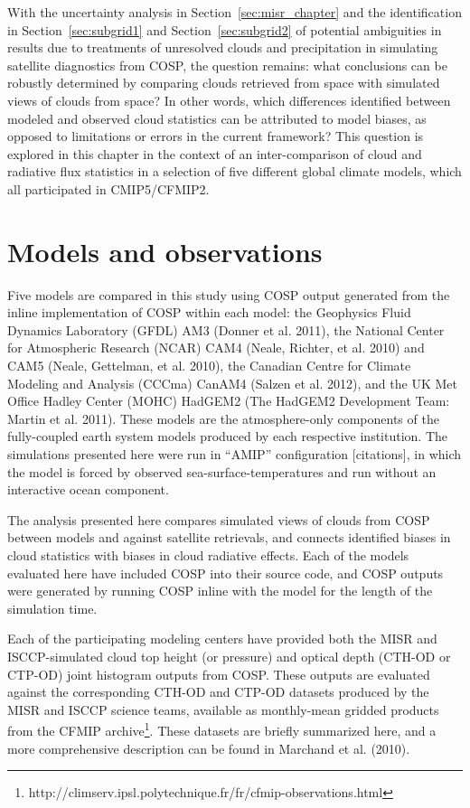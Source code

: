 With the uncertainty analysis in Section~\ref{sec:misr_chapter} and the
identification in Section~\ref{sec:subgrid1} and
Section~\ref{sec:subgrid2} of potential ambiguities in results due to
treatments of unresolved clouds and precipitation in simulating
satellite diagnostics from COSP, the question remains: what conclusions
can be robustly determined by comparing clouds retrieved from space with
simulated views of clouds from space? In other words, which differences
identified between modeled and observed cloud statistics can be
attributed to model biases, as opposed to limitations or errors in the
current framework? This question is explored in this chapter in the
context of an inter-comparison of cloud and radiative flux statistics in
a selection of five different global climate models, which all
participated in CMIP5/CFMIP2.

\section{Models and observations}\label{models-and-observations}

Five models are compared in this study using COSP output generated from
the inline implementation of COSP within each model: the Geophysics
Fluid Dynamics Laboratory (GFDL) AM3 (Donner et al. 2011), the National
Center for Atmospheric Research (NCAR) CAM4 (Neale, Richter, et al.
2010) and CAM5 (Neale, Gettelman, et al. 2010), the Canadian Centre for
Climate Modeling and Analysis (CCCma) CanAM4 (Salzen et al. 2012), and
the UK Met Office Hadley Center (MOHC) HadGEM2 (The HadGEM2 Development
Team: Martin et al. 2011). These models are the atmosphere-only
components of the fully-coupled earth system models produced by each
respective institution. The simulations presented here were run in
``AMIP'' configuration {[}citations{]}, in which the model is forced by
observed sea-surface-temperatures and run without an interactive ocean
component.

The analysis presented here compares simulated views of clouds from COSP
between models and against satellite retrievals, and connects identified
biases in cloud statistics with biases in cloud radiative effects. Each
of the models evaluated here have included COSP into their source code,
and COSP outputs were generated by running COSP inline with the model
for the length of the simulation time.

Each of the participating modeling centers have provided both the MISR
and ISCCP-simulated cloud top height (or pressure) and optical depth
(CTH-OD or CTP-OD) joint histogram outputs from COSP. These outputs are
evaluated against the corresponding CTH-OD and CTP-OD datasets produced
by the MISR and ISCCP science teams, available as monthly-mean gridded
products from the CFMIP archive\footnote{http://climserv.ipsl.polytechnique.fr/fr/cfmip-observations.html}.
These datasets are briefly summarized here, and a more comprehensive
description can be found in Marchand et al. (2010).

